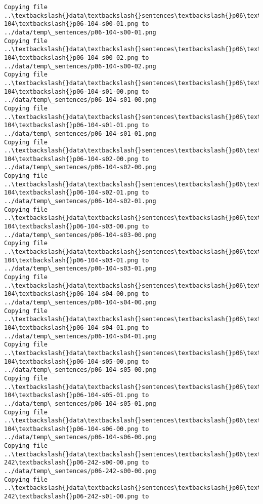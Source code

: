 \documentclass[11pt]{article}
\begin{document}
\begin{Verbatim}[commandchars=\\\{\}]
Copying file ..\textbackslash{}data\textbackslash{}sentences\textbackslash{}p06\textbackslash{}p06-104\textbackslash{}p06-104-s00-01.png to
../data/temp\_sentences/p06-104-s00-01.png
Copying file ..\textbackslash{}data\textbackslash{}sentences\textbackslash{}p06\textbackslash{}p06-104\textbackslash{}p06-104-s00-02.png to
../data/temp\_sentences/p06-104-s00-02.png
Copying file ..\textbackslash{}data\textbackslash{}sentences\textbackslash{}p06\textbackslash{}p06-104\textbackslash{}p06-104-s01-00.png to
../data/temp\_sentences/p06-104-s01-00.png
Copying file ..\textbackslash{}data\textbackslash{}sentences\textbackslash{}p06\textbackslash{}p06-104\textbackslash{}p06-104-s01-01.png to
../data/temp\_sentences/p06-104-s01-01.png
Copying file ..\textbackslash{}data\textbackslash{}sentences\textbackslash{}p06\textbackslash{}p06-104\textbackslash{}p06-104-s02-00.png to
../data/temp\_sentences/p06-104-s02-00.png
Copying file ..\textbackslash{}data\textbackslash{}sentences\textbackslash{}p06\textbackslash{}p06-104\textbackslash{}p06-104-s02-01.png to
../data/temp\_sentences/p06-104-s02-01.png
Copying file ..\textbackslash{}data\textbackslash{}sentences\textbackslash{}p06\textbackslash{}p06-104\textbackslash{}p06-104-s03-00.png to
../data/temp\_sentences/p06-104-s03-00.png
Copying file ..\textbackslash{}data\textbackslash{}sentences\textbackslash{}p06\textbackslash{}p06-104\textbackslash{}p06-104-s03-01.png to
../data/temp\_sentences/p06-104-s03-01.png
Copying file ..\textbackslash{}data\textbackslash{}sentences\textbackslash{}p06\textbackslash{}p06-104\textbackslash{}p06-104-s04-00.png to
../data/temp\_sentences/p06-104-s04-00.png
Copying file ..\textbackslash{}data\textbackslash{}sentences\textbackslash{}p06\textbackslash{}p06-104\textbackslash{}p06-104-s04-01.png to
../data/temp\_sentences/p06-104-s04-01.png
Copying file ..\textbackslash{}data\textbackslash{}sentences\textbackslash{}p06\textbackslash{}p06-104\textbackslash{}p06-104-s05-00.png to
../data/temp\_sentences/p06-104-s05-00.png
Copying file ..\textbackslash{}data\textbackslash{}sentences\textbackslash{}p06\textbackslash{}p06-104\textbackslash{}p06-104-s05-01.png to
../data/temp\_sentences/p06-104-s05-01.png
Copying file ..\textbackslash{}data\textbackslash{}sentences\textbackslash{}p06\textbackslash{}p06-104\textbackslash{}p06-104-s06-00.png to
../data/temp\_sentences/p06-104-s06-00.png
Copying file ..\textbackslash{}data\textbackslash{}sentences\textbackslash{}p06\textbackslash{}p06-242\textbackslash{}p06-242-s00-00.png to
../data/temp\_sentences/p06-242-s00-00.png
Copying file ..\textbackslash{}data\textbackslash{}sentences\textbackslash{}p06\textbackslash{}p06-242\textbackslash{}p06-242-s01-00.png to

\end{Verbatim}
\end{document}

